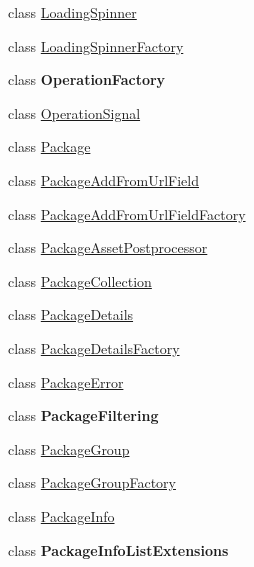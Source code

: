 \begin{DoxyCompactItemize}
\item 
class \mbox{\hyperlink{class_unity_editor_1_1_package_manager_1_1_u_i_1_1_loading_spinner}{Loading\+Spinner}}
\item 
class \mbox{\hyperlink{class_unity_editor_1_1_package_manager_1_1_u_i_1_1_loading_spinner_factory}{Loading\+Spinner\+Factory}}
\item 
class {\bfseries Operation\+Factory}
\item 
class \mbox{\hyperlink{class_unity_editor_1_1_package_manager_1_1_u_i_1_1_operation_signal}{Operation\+Signal}}
\item 
class \mbox{\hyperlink{class_unity_editor_1_1_package_manager_1_1_u_i_1_1_package}{Package}}
\item 
class \mbox{\hyperlink{class_unity_editor_1_1_package_manager_1_1_u_i_1_1_package_add_from_url_field}{Package\+Add\+From\+Url\+Field}}
\item 
class \mbox{\hyperlink{class_unity_editor_1_1_package_manager_1_1_u_i_1_1_package_add_from_url_field_factory}{Package\+Add\+From\+Url\+Field\+Factory}}
\item 
class \mbox{\hyperlink{class_unity_editor_1_1_package_manager_1_1_u_i_1_1_package_asset_postprocessor}{Package\+Asset\+Postprocessor}}
\item 
class \mbox{\hyperlink{class_unity_editor_1_1_package_manager_1_1_u_i_1_1_package_collection}{Package\+Collection}}
\item 
class \mbox{\hyperlink{class_unity_editor_1_1_package_manager_1_1_u_i_1_1_package_details}{Package\+Details}}
\item 
class \mbox{\hyperlink{class_unity_editor_1_1_package_manager_1_1_u_i_1_1_package_details_factory}{Package\+Details\+Factory}}
\item 
class \mbox{\hyperlink{class_unity_editor_1_1_package_manager_1_1_u_i_1_1_package_error}{Package\+Error}}
\item 
class {\bfseries Package\+Filtering}
\item 
class \mbox{\hyperlink{class_unity_editor_1_1_package_manager_1_1_u_i_1_1_package_group}{Package\+Group}}
\item 
class \mbox{\hyperlink{class_unity_editor_1_1_package_manager_1_1_u_i_1_1_package_group_factory}{Package\+Group\+Factory}}
\item 
class \mbox{\hyperlink{class_unity_editor_1_1_package_manager_1_1_u_i_1_1_package_info}{Package\+Info}}
\item 
class {\bfseries Package\+Info\+List\+Extensions}
\item 

\end{DoxyCompactItemize}
